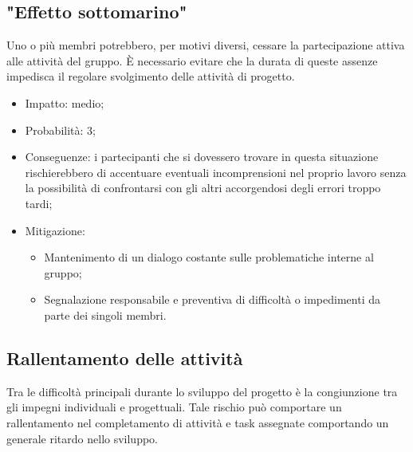 \documentclass[a4paper, twoside]{article}
\begin{document}
\subsection{"Effetto sottomarino"}

Uno o più membri potrebbero, per motivi diversi, cessare la partecipazione attiva alle attività del gruppo. È necessario evitare che la durata di queste assenze impedisca il regolare svolgimento delle attività di progetto.

\begin{itemize}
    \item Impatto: medio;

    \item Probabilità: 3;

    \item Conseguenze: i partecipanti che si dovessero trovare in questa situazione rischierebbero di accentuare eventuali incomprensioni nel proprio lavoro senza la possibilità di confrontarsi con gli altri accorgendosi degli errori troppo tardi;

    \item Mitigazione:
        \begin{itemize}
            \item Mantenimento di un dialogo costante sulle problematiche interne al gruppo;
            \item Segnalazione responsabile e preventiva di difficoltà o impedimenti da parte dei singoli membri.
        \end{itemize}
\end{itemize}


\subsection{Rallentamento delle attività}
Tra le difficoltà principali durante lo sviluppo del progetto è la congiunzione tra gli impegni individuali e progettuali. Tale rischio può comportare un rallentamento nel completamento di attività e task assegnate comportando un generale ritardo nello sviluppo.
\end{document}
